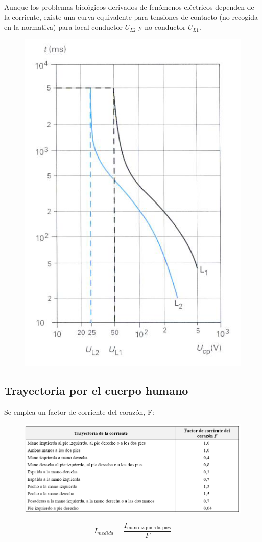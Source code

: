 Aunque los problemas biológicos derivados de fenómenos eléctricos dependen de la corriente, existe una curva equivalente para tensiones de contacto (no recogida en la normativa) para local conductor $U_{L2}$ y no conductor $U_{L1}$.
\begin{figure}[H]
	\centering
	\includegraphics[width=0.4\linewidth]{Images/24}
	\label{fig:24}
\end{figure}

\subsection{Trayectoria por el cuerpo humano}
Se emplea un factor de corriente del corazón, F:
\begin{figure}[H]
	\centering
	\includegraphics[width=0.7\linewidth]{Images/25}
	\label{fig:25}
\end{figure}

\begin{equation}
	I_{medida}=\dfrac{I_{\text{mano izquierda-pies}}}{F}
\end{equation}
